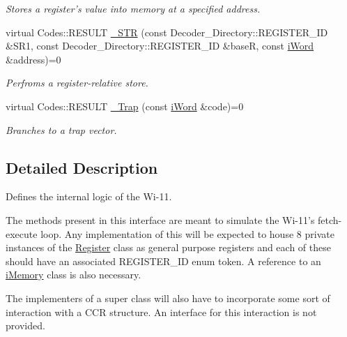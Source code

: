 \begin{DoxyCompactItemize}
\begin{DoxyCompactList}\small\item\em Stores a register's value into memory at a specified address. \item\end{DoxyCompactList}\item 
virtual Codes::RESULT \hyperlink{classiWi11_aec2d6cb4a20c44ce3f9468964831d39b}{\_\-STR} (const Decoder\_\-Directory::REGISTER\_\-ID \&SR1, const Decoder\_\-Directory::REGISTER\_\-ID \&baseR, const \hyperlink{classiWord}{iWord} \&address)=0
\begin{DoxyCompactList}\small\item\em Perfroms a register-\/relative store. \item\end{DoxyCompactList}\item 
virtual Codes::RESULT \hyperlink{classiWi11_a74da9304180f3cbece4b7e87e8a53a5d}{\_\-Trap} (const \hyperlink{classiWord}{iWord} \&code)=0
\begin{DoxyCompactList}\small\item\em Branches to a trap vector. \item\end{DoxyCompactList}\end{DoxyCompactItemize}


\subsection{Detailed Description}
Defines the internal logic of the Wi-\/11. \begin{DoxyParagraph}{}
The methods present in this interface are meant to simulate the Wi-\/11's fetch-\/execute loop. Any implementation of this will be expected to house 8 private instances of the \hyperlink{classRegister}{Register} class as general purpose registers and each of these should have an associated REGISTER\_\-ID enum token. A reference to an \hyperlink{classiMemory}{iMemory} class is also necessary.
\end{DoxyParagraph}
\begin{DoxyParagraph}{}
The implementers of a super class will also have to incorporate some sort of interaction with a CCR structure. An interface for this interaction is not provided. 
\end{DoxyParagraph}


